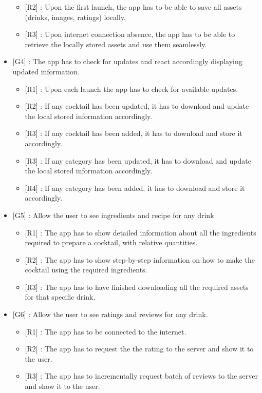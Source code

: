 \documentclass[paper=a4, fontsize=12pt]{scrartcl}
\numberwithin{equation}{section}		%
\numberwithin{figure}{section}			%
\numberwithin{table}{section}				%
\begin{document}
\begin{itemize}
\begin{itemize}
\item {[R2]} : Upon the first launch, the app has to be able to save all assets (drinks, images, ratings) locally.
\item {[R3]} : Upon internet connection absence, the app has to be able to retrieve the locally stored assets and use them seamlessly.
\end{itemize}
\item {[G4]} : The app has to check for updates and react accordingly displaying updated information.
\begin{itemize}
\item {[R1]} : Upon each launch the app has to check for available updates.
\item {[R2]} : If any cocktail has been updated, it has to download and update the local stored information accordingly.
\item {[R3]} : If any cocktail has been added, it has to download and store it accordingly.
\item {[R3]} : If any category has been updated, it has to download and update the local stored information accordingly.
\item {[R4]} : If any category has been added, it has to download and store it accordingly.
\end{itemize}
\item {[G5]} : Allow the user to see ingredients and recipe for any drink
\begin{itemize}
\item {[R1]} : The app has to show detailed information about all the ingredients required to prepare a cocktail, with relative quantities.
\item {[R2]} : The app has to show step-by-step information on how to make the cocktail using the required ingredients.
\item {[R3]} : The app has to have finished downloading all the required assets for that specific drink.
\end{itemize}
\item {[G6]} : Allow the user to see ratings and reviews for any drink.
\begin{itemize}
\item {[R1]} : The app has to be connected to the internet.
\item {[R2]} : The app has to request the the rating to the server and show it to the user.
\item {[R3]} : The app has to incrementally request batch of reviews to the server and show it to the user.
\end{itemize}

\end{itemize}
\end{document}
